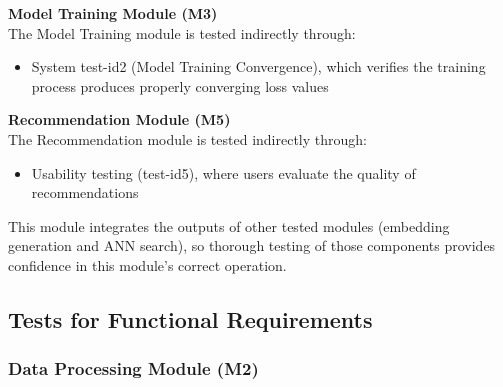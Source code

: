 \documentclass[12pt, titlepage]{article}
\begin{document}
\noindent\textbf{Model Training Module (M3)}\\
The Model Training module is tested indirectly through:
\begin{itemize}
    \item System test-id2 (Model Training Convergence), which verifies the training process produces properly converging loss values
\end{itemize}


\noindent\textbf{Recommendation Module (M5)}\\
The Recommendation module is tested indirectly through:
\begin{itemize}
    \item Usability testing (test-id5), where users evaluate the quality of recommendations
\end{itemize}

This module integrates the outputs of other tested modules (embedding generation and ANN search), so thorough testing of those components provides confidence in this module's correct operation.


\subsection{Tests for Functional Requirements}

\subsubsection{Data Processing Module (M2)}
\end{document}
